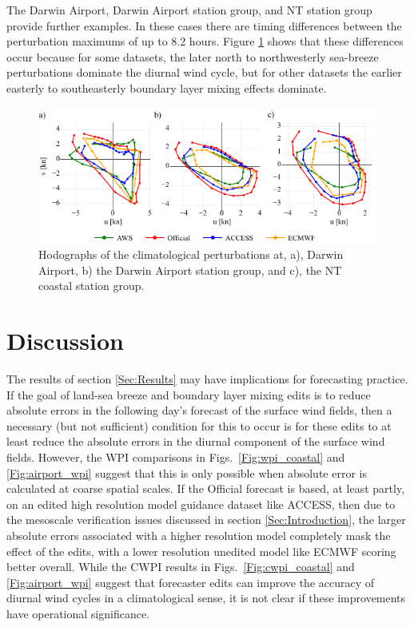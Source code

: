 \documentclass[twocol]{ametsoc}
\begin{document}
The Darwin Airport, Darwin Airport station group, and NT station group provide further examples. In these cases there are timing differences between the perturbation maximums of up to 8.2 hours. Figure \ref{Fig:nt_ellipse_hodo} shows that these differences occur because for some datasets, the later north to northwesterly sea-breeze perturbations dominate the diurnal wind cycle, but for other datasets the earlier easterly to southeasterly boundary layer mixing effects dominate. 

\begin{figure}
\centering
\includegraphics[width=39pc]{nt_ellipse_hodo.pdf}
\caption{Hodographs of the climatological perturbations at, a), Darwin Airport, b) the Darwin Airport station group, and c), the NT coastal station group.}
\label{Fig:nt_ellipse_hodo}
\end{figure}

\section{Discussion}
\label{Sec:Discussion}
The results of section \ref{Sec:Results} may have implications for forecasting practice. If the goal of land-sea breeze and boundary layer mixing edits is to reduce absolute errors in the following day's forecast of the surface wind fields, then a necessary (but not sufficient) condition for this to occur is for these edits to at least reduce the absolute errors in the diurnal component of the surface wind fields. However, the WPI comparisons in Figs.~\ref{Fig:wpi_coastal} and \ref{Fig:airport_wpi} suggest that this is only possible when absolute error is calculated at coarse spatial scales. If the Official forecast is based, at least partly, on an edited high resolution model guidance dataset like ACCESS, then due to the mesoscale verification issues discussed in section \ref{Sec:Introduction}, the larger absolute errors associated with a higher resolution model completely mask the effect of the edits, with a lower resolution unedited model like ECMWF scoring better overall. While the CWPI results in Figs.~\ref{Fig:cwpi_coastal} and \ref{Fig:airport_wpi} suggest that forecaster edits can improve the accuracy of diurnal wind cycles in a climatological sense, it is not clear if these improvements have operational significance. 
\end{document}
